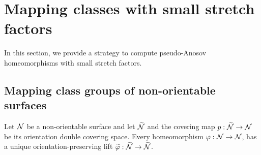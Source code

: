 \section{Mapping classes with small stretch factors}
\label{sec:mapping-classes-with}

In this section, we provide a strategy to compute pseudo-Anosov homeomorphisms with small stretch factors.

\subsection{Mapping class groups of non-orientable surfaces}
\label{sec:backgr-mapp-class}
Let $\mathcal{N}$ be a non-orientable surface and let $\widetilde{\mathcal{N}}$ and the covering map $p:\widetilde{\mathcal{N}}\rightarrow \mathcal{N}$ be its orientation double covering space.
Every homeomorphism $\varphi: \mathcal{N} \to \mathcal{N}$, has a unique orientation-preserving lift $\widetilde{\varphi}: \widetilde{\mathcal{N}} \to \widetilde{\mathcal{N}}$.


